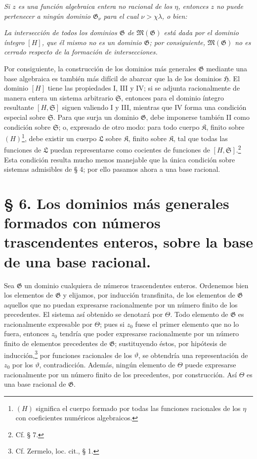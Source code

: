 \emph{Si $z$ es una función algebraica entera no racional de los $\eta$, entonces $z$ no puede pertenecer a ningún dominio $\mathfrak G_\nu$ para el cual $\nu>\chi\lambda$, o bien:}

\emph{La intersección de todos los dominios $\mathfrak G$ de $\mathfrak M(\mathfrak G)$ está dada por el dominio íntegro $[H]$, que él mismo no es un dominio $\mathfrak G$; por consiguiente, $\mathfrak M(\mathfrak G)$ no es cerrado respecto de la formación de intersecciones.}

Por consiguiente, la construcción de los dominios más generales $\mathfrak G$ mediante una base algebraica es también más difícil de abarcar que la de los dominios $\mathfrak H$. El dominio $[H]$ tiene las propiedades I, III y IV; si se adjunta racionalmente de manera entera un sistema arbitrario $\mathfrak S$, entonces para el dominio íntegro resultante $[H,\mathfrak S]$ siguen valiendo I y III, mientras que IV forma una condición especial sobre $\mathfrak S$. Para que surja un dominio $\mathfrak G$, debe imponerse también II como condición sobre $\mathfrak S$; o, expresado de otro modo: para todo cuerpo $\mathfrak K$, finito sobre $(H)$\footnote{$(H)$ significa el cuerpo formado por todas las funciones racionales de los $\eta$ con coeficientes numéricos algebraicos.}, debe existir un cuerpo $\mathfrak L$ sobre $\mathfrak K$, finito sobre $\mathfrak K$, tal que todas las funciones de $\mathfrak L$ puedan representarse como cocientes de funciones de $[H,\mathfrak S]$.\footnote{Cf. § 7.} Esta condición resulta mucho menos manejable que la única condición sobre sistemas admisibles de § 4; por ello pasamos ahora a una base racional.

\section*{§ 6. Los dominios más generales formados con números trascendentes enteros, sobre la base de una base racional.}

Sea $\mathfrak G$ un dominio cualquiera de números trascendentes enteros. Ordenemos bien los elementos de $\mathfrak G$ y elijamos, por inducción transfinita, de los elementos de $\mathfrak G$ aquellos que no puedan expresarse racionalmente por un número finito de los precedentes. El sistema así obtenido se denotará por $\Theta$. Todo elemento de $\mathfrak G$ es racionalmente expresable por $\Theta$; pues si $z_0$ fuese el primer elemento que no lo fuera, entonces $z_0$ tendría que poder expresarse racionalmente por un número finito de elementos precedentes de $\mathfrak G$; sustituyendo éstos, por hipótesis de inducción,\footnote{Cf. Zermelo, loc. cit., § 1.} por funciones racionales de los $\vartheta$, se obtendría una representación de $z_0$ por los $\vartheta$, contradicción. Además, ningún elemento de $\Theta$ puede expresarse racionalmente por un número finito de los precedentes, por construcción. Así $\Theta$ es una base racional de $\mathfrak G$.

